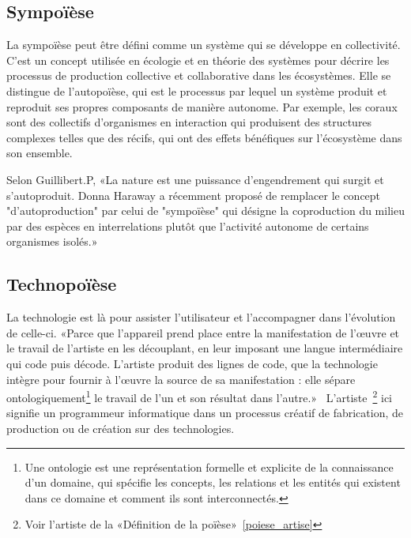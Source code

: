 
\subsection{Sympoïèse}

La sympoïèse peut être défini comme un système qui se développe en collectivité. C'est un concept utilisée en écologie et en théorie des systèmes pour décrire les processus de production collective et collaborative dans les écosystèmes. Elle se distingue de l'autopoïèse, qui est le processus par lequel un système produit et reproduit ses propres composants de manière autonome. Par exemple, les coraux sont des collectifs d'organismes en interaction qui produisent des structures complexes telles que des récifs, qui ont des effets bénéfiques sur l'écosystème dans son ensemble.

Selon Guillibert.P, «La nature est une puissance d’engendrement qui surgit et s’autoproduit. Donna Haraway a récemment proposé de remplacer le concept "d’autoproduction" par celui de "sympoïèse" qui désigne la coproduction du milieu par des espèces en interrelations plutôt que l’activité autonome de certains organismes isolés.»~\cite{guillibert:tel-02929676}

\subsection{Technopoïèse}



La technologie est là pour assister l'utilisateur et l'accompagner dans l'évolution de celle-ci. «Parce que l’appareil prend place entre la manifestation de l’œuvre et le travail de l’artiste en les découplant, en leur imposant une langue intermédiaire qui code puis décode. L’artiste produit des lignes de code, que la technologie intègre pour fournir à l’œuvre la source de sa manifestation : elle sépare ontologiquement\footnote{Une ontologie est une représentation formelle et explicite de la connaissance d'un domaine, qui spécifie les concepts, les relations et les entités qui existent dans ce domaine et comment ils sont interconnectés.} le travail de l’un et son résultat dans l’autre.»~\cite{artiste_techno_conf_2012} L'artiste~\footnote{Voir l'artiste de la «Définition de la poïèse»~\ref{poiese_artise}} ici signifie un programmeur informatique dans un processus créatif de fabrication, de production ou de création sur des technologies.

